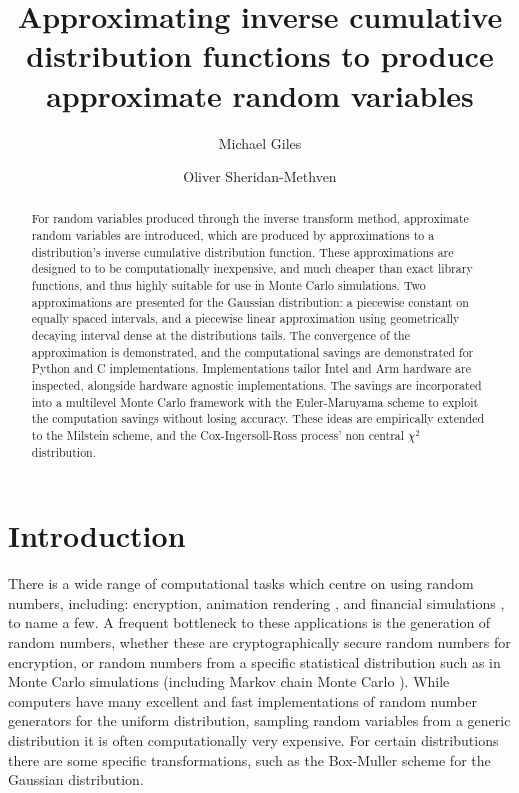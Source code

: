 \documentclass[manuscript,review]{acmart}
\title{Approximating inverse cumulative distribution functions to produce approximate random variables}
\author{Michael Giles}
\author{Oliver Sheridan-Methven}
\affiliation{%
\institution{Mathematical Institute, Oxford University}
\city{Oxford}
\country{UK}}
\begin{document}
\begin{abstract}
For random variables produced through the inverse transform method, approximate random variables are introduced, which are produced by approximations to a distribution's inverse cumulative distribution function. These approximations are designed to to be computationally inexpensive, and much cheaper than exact library functions, and thus highly suitable for use in Monte Carlo simulations. Two approximations are presented for the Gaussian distribution: a piecewise constant on equally spaced intervals, and a piecewise linear approximation using geometrically decaying interval dense at the distributions tails. The convergence of the approximation is demonstrated, and the computational savings are demonstrated for Python and C implementations. Implementations tailor Intel and Arm hardware are inspected, alongside hardware agnostic implementations. The savings are incorporated into a multilevel Monte Carlo framework with the Euler-Maruyama scheme to exploit the computation savings without losing accuracy. These ideas are empirically extended to the Milstein scheme, and the Cox-Ingersoll-Ross process' non central $ \chi^2 $ distribution. 
\end{abstract}

\maketitle

\section{Introduction}
\label{sec:introduction}

There is a wide range of computational tasks which centre on using random numbers, including: encryption, animation rendering \citep{lee2017vectorized}, and financial simulations \citep{glasserman2013monte}, to name a few. A frequent bottleneck to these applications is the generation of random numbers, whether these are cryptographically secure random numbers for encryption, or random numbers from a specific statistical distribution such as in Monte Carlo simulations (including Markov chain Monte Carlo \citep{hoang2013complexity,scheichl2017quasi}).  While computers have many excellent and fast implementations of random number generators for the uniform distribution, sampling random variables from a generic distribution it is often computationally very expensive. For certain distributions there are some specific transformations, such as the Box-Muller scheme \citep{box1958note} for the Gaussian distribution. 
\end{document}
